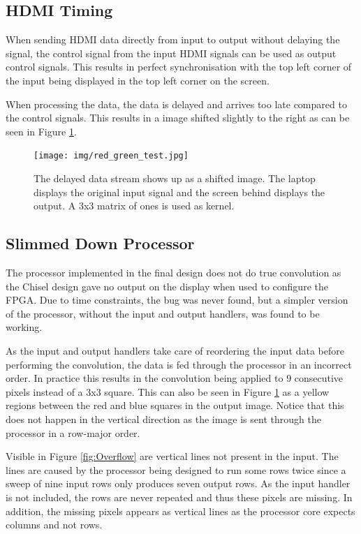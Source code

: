 \subsection{HDMI Timing}
When sending HDMI data directly from input to output without delaying the signal, the control signal from the input HDMI signals can be used as output control signals.
This results in perfect synchronisation with the top left corner of the input being displayed in the top left corner on the screen.

When processing the data, the data is delayed and arrives too late compared to the control signals. This results in a image shifted slightly to the right as can be seen in Figure \ref{fig:SyncDelay}.

\begin{figure}
    \centering
    \texttt{[image: img/red\_green\_test.jpg]}
    \caption[The delayed data stream]{
        The delayed data stream shows up as a shifted image.
        The laptop displays the original input signal and the screen behind displays the output.
        A 3x3 matrix of ones is used as kernel.
    }
    \label{fig:SyncDelay}
\end{figure}

\subsection{Slimmed Down Processor}
The processor implemented in the final design does not do true convolution as the Chisel design gave no output on the display when used to configure the FPGA.
Due to time constraints, the bug was never found, but a simpler version of the processor, without the input and output handlers, was found to be working.

As the input and output handlers take care of reordering the input data before performing the convolution, the data is fed through the processor in an incorrect order.
In practice this results in the convolution being applied to 9 consecutive pixels instead of a 3x3 square.
This can also be seen in Figure \ref{fig:SyncDelay} as a yellow regions between the red and blue squares in the output image.
Notice that this does not happen in the vertical direction as the image is sent through the processor in a row-major order.

Visible in Figure \ref{fig:Overflow} are vertical lines not present in the input.
The lines are caused by the processor being designed to run some rows twice since a sweep of nine input rows only produces seven output rows.
As the input handler is not included, the rows are never repeated and thus these pixels are missing.
In addition, the missing pixels appears as vertical lines as the processor core expects columns and not rows.

